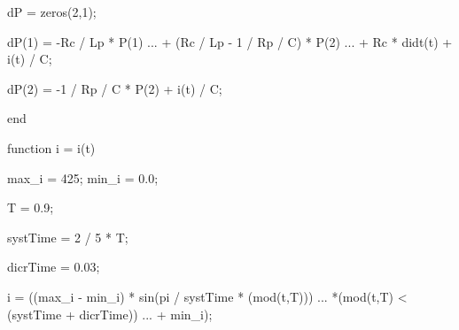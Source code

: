 \documentclass[
  a4paper,
  DIV=11,
  numbers=noendperiod,
  oneside]{scrreprt}
\newenvironment{Shaded}{\begin{snugshade}}{\end{snugshade}}
\newcommand{\FloatTok}[1]{\textcolor[rgb]{0.68,0.00,0.00}{#1}}
\newcommand{\KeywordTok}[1]{\textcolor[rgb]{0.00,0.23,0.31}{#1}}
\newcommand{\NormalTok}[1]{\textcolor[rgb]{0.00,0.23,0.31}{#1}}
\newcommand{\OperatorTok}[1]{\textcolor[rgb]{0.37,0.37,0.37}{#1}}
\newcommand{\VariableTok}[1]{\textcolor[rgb]{0.07,0.07,0.07}{#1}}
\begin{document}
\begin{Shaded}
\begin{Highlighting}[]
\VariableTok{dP}    \OperatorTok{=} \VariableTok{zeros}\NormalTok{(}\FloatTok{2}\OperatorTok{,}\FloatTok{1}\NormalTok{)}\OperatorTok{;}

\VariableTok{dP}\NormalTok{(}\FloatTok{1}\NormalTok{) }\OperatorTok{=} \OperatorTok{{-}}\VariableTok{Rc} \OperatorTok{/} \VariableTok{Lp} \OperatorTok{*} \VariableTok{P}\NormalTok{(}\FloatTok{1}\NormalTok{) }\OperatorTok{...}
    \OperatorTok{+}\NormalTok{ (}\VariableTok{Rc} \OperatorTok{/} \VariableTok{Lp} \OperatorTok{{-}} \FloatTok{1} \OperatorTok{/} \VariableTok{Rp} \OperatorTok{/} \VariableTok{C}\NormalTok{) }\OperatorTok{*} \VariableTok{P}\NormalTok{(}\FloatTok{2}\NormalTok{) }\OperatorTok{...}
    \OperatorTok{+} \VariableTok{Rc} \OperatorTok{*} \VariableTok{didt}\NormalTok{(}\VariableTok{t}\NormalTok{) }\OperatorTok{+} \VariableTok{i}\NormalTok{(}\VariableTok{t}\NormalTok{) }\OperatorTok{/} \VariableTok{C}\OperatorTok{;}

\VariableTok{dP}\NormalTok{(}\FloatTok{2}\NormalTok{) }\OperatorTok{=} \OperatorTok{{-}}\FloatTok{1} \OperatorTok{/} \VariableTok{Rp} \OperatorTok{/} \VariableTok{C} \OperatorTok{*} \VariableTok{P}\NormalTok{(}\FloatTok{2}\NormalTok{) }\OperatorTok{+} \VariableTok{i}\NormalTok{(}\VariableTok{t}\NormalTok{) }\OperatorTok{/} \VariableTok{C}\OperatorTok{;}

\KeywordTok{end}

\KeywordTok{function} \VariableTok{i} \OperatorTok{=} \VariableTok{i}\NormalTok{(}\VariableTok{t}\NormalTok{)}

\VariableTok{max\_i} \OperatorTok{=} \FloatTok{425}\OperatorTok{;}
\VariableTok{min\_i} \OperatorTok{=} \FloatTok{0.0}\OperatorTok{;}

\VariableTok{T} \OperatorTok{=} \FloatTok{0.9}\OperatorTok{;}

\VariableTok{systTime} \OperatorTok{=} \FloatTok{2} \OperatorTok{/} \FloatTok{5} \OperatorTok{*} \VariableTok{T}\OperatorTok{;}

\VariableTok{dicrTime} \OperatorTok{=} \FloatTok{0.03}\OperatorTok{;}

\VariableTok{i} \OperatorTok{=}\NormalTok{ ((}\VariableTok{max\_i} \OperatorTok{{-}} \VariableTok{min\_i}\NormalTok{) }\OperatorTok{*} \VariableTok{sin}\NormalTok{(}\VariableTok{pi} \OperatorTok{/} \VariableTok{systTime} \OperatorTok{*}\NormalTok{ (}\VariableTok{mod}\NormalTok{(}\VariableTok{t}\OperatorTok{,}\VariableTok{T}\NormalTok{))) }\OperatorTok{...}
    \OperatorTok{*}\NormalTok{(}\VariableTok{mod}\NormalTok{(}\VariableTok{t}\OperatorTok{,}\VariableTok{T}\NormalTok{) }\OperatorTok{\textless{}}\NormalTok{ (}\VariableTok{systTime} \OperatorTok{+} \VariableTok{dicrTime}\NormalTok{)) }\OperatorTok{...}
    \OperatorTok{+} \VariableTok{min\_i}\NormalTok{)}\OperatorTok{;}


\end{Highlighting}
\end{Shaded}
\end{document}
